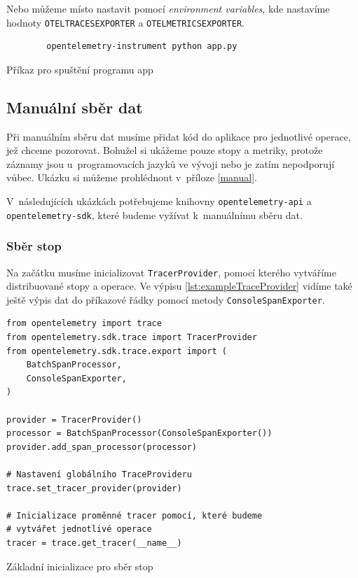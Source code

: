 Nebo můžeme místo nastavit pomocí \textit{environment variables}, kde nastavíme hodnoty \newline \texttt{OTEL\textunderscore TRACES\textunderscore EXPORTER} a \texttt{OTEL\textunderscore METRICS\textunderscore EXPORTER}.
\begin{listing}[H]
    \begin{verbatim}
        opentelemetry-instrument python app.py
    \end{verbatim}
    \caption{Příkaz pro spuštění programu app}
    \label{lst:bash2}
\end{listing}

\subsection{Manuální sběr dat}

Při manuálním sběru dat musíme přidat kód do aplikace pro jednotlivé operace, jež chceme pozorovat. Bohužel si ukážeme pouze stopy a metriky, protože záznamy jsou u~programovacích jazyků ve vývoji nebo je zatím nepodporují vůbec. Ukázku si můžeme prohlédnout v~příloze \ref{manual}.
    
V~následujících ukázkách potřebujeme knihovny \texttt{opentelemetry-api} a \\ \texttt{opentelemetry-sdk}, které budeme vyžívat k~manuálnímu sběru dat.

\subsubsection{Sběr stop}
Na začátku musíme inicializovat \texttt{TracerProvider}, pomocí kterého vytváříme distribuované stopy a operace. Ve výpisu \ref{lst:exampleTraceProvider} vidíme také ještě výpis dat do příkazové řádky pomocí metody \texttt{ConsoleSpanExporter}.

\begin{listing}[H]
    \begin{verbatim}
from opentelemetry import trace
from opentelemetry.sdk.trace import TracerProvider
from opentelemetry.sdk.trace.export import (
    BatchSpanProcessor,
    ConsoleSpanExporter,
)

provider = TracerProvider()
processor = BatchSpanProcessor(ConsoleSpanExporter())
provider.add_span_processor(processor)

# Nastavení globálního TraceProvideru
trace.set_tracer_provider(provider)

# Inicializace proměnné tracer pomocí, které budeme  
# vytvářet jednotlivé operace
tracer = trace.get_tracer(__name__)
\end{verbatim}
    \caption{Základní inicializace pro sběr stop}
    \label{lst:exampleTraceProvider}
\end{listing}

